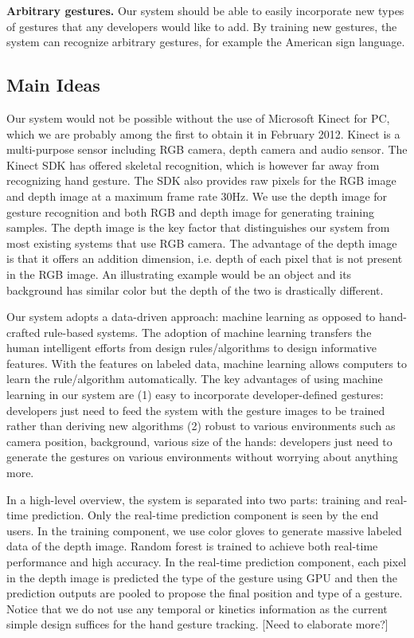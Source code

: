 \textbf{Arbitrary gestures.} Our system should be able to easily incorporate new types of gestures that any developers would like to add. By training new gestures, the system can recognize arbitrary gestures, for example the American sign language. 

\subsection{Main Ideas}
Our system would not be possible without the use of Microsoft Kinect for PC, which we are probably among the first to obtain it in February 2012. Kinect is a multi-purpose sensor including RGB camera, depth camera and audio sensor. The Kinect SDK has offered skeletal recognition, which is however far away from recognizing hand gesture. The SDK also provides raw pixels for the RGB image and depth image at a maximum frame rate 30Hz. We use the depth image for gesture recognition and both RGB and depth image for generating training samples. The depth image is the key factor that distinguishes our system from most existing systems that use RGB camera. The advantage of the depth image is that it offers an addition dimension, i.e. depth of each pixel that is not present in the RGB image. An illustrating example would be an object and its background has similar color but the depth of the two is drastically different. 

Our system adopts a data-driven approach: machine learning as opposed to hand-crafted rule-based systems. The adoption of machine learning transfers the human intelligent efforts from design rules/algorithms to design informative features. With the features on labeled data, machine learning allows computers to learn the rule/algorithm automatically. The key advantages of using machine learning in our system    
are (1) easy to incorporate developer-defined gestures: developers just need to feed the system with the gesture images to be trained rather than deriving new algorithms (2) robust to various environments such as camera position, background, various size of the hands: developers just need to generate the gestures on various environments without worrying about anything more. 

In a high-level overview, the system is separated into two parts: training and real-time prediction. Only the real-time prediction component is seen by the end users. In the training component, we use color gloves to generate massive labeled data of the depth image. Random forest is trained to achieve both real-time performance and high accuracy. In the real-time prediction component, each pixel in the depth image is predicted the type of the gesture using GPU and then the prediction outputs are pooled to propose the final position and type of a gesture. Notice that we do not use any temporal or kinetics information as the current simple design suffices for the hand gesture tracking.   [Need to elaborate more?] 



